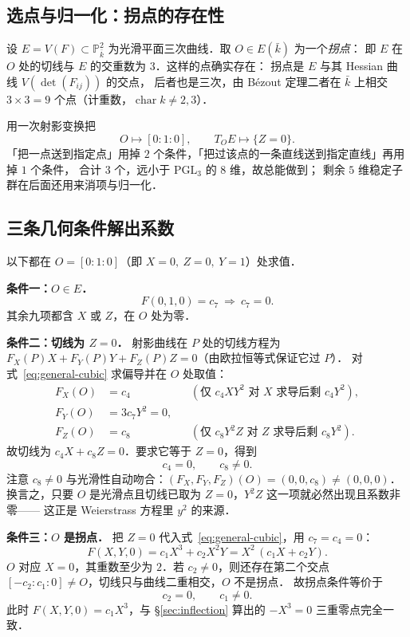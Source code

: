 \documentclass[10pt,a4paper]{article}
\numberwithin{equation}{section}
\begin{document}
\subsection{选点与归一化：拐点的存在性}

设 $E=V(F)\subset\mathbb P^{2}_{\bar k}$ 为光滑平面三次曲线．取 $O\in E(\bar k)$ 为一个\emph{拐点}：
即 $E$ 在 $O$ 处的切线与 $E$ 的交重数为 $3$．这样的点确实存在：
拐点是 $E$ 与其 Hessian 曲线 $V(\det(F_{ij}))$ 的交点，
后者也是三次，由 Bézout 定理二者在 $\bar k$ 上相交 $3\times3=9$ 个点（计重数，$\operatorname{char}k\neq2,3$）．

用一次射影变换把
\[
O\longmapsto[0:1:0],\qquad T_{O}E\longmapsto\{Z=0\}.
\]
「把一点送到指定点」用掉 $2$ 个条件，「把过该点的一条直线送到指定直线」再用掉 $1$ 个条件，
合计 $3$ 个，远小于 $\mathrm{PGL}_{3}$ 的 $8$ 维，故总能做到；
剩余 $5$ 维稳定子群在后面还用来消项与归一化．

\subsection{三条几何条件解出系数}

以下都在 $O=[0:1:0]$（即 $X=0,\ Z=0,\ Y=1$）处求值．

\textbf{条件一：$O\in E$．}
\[
F(0,1,0)=c_{7}\ \Longrightarrow\ \boxed{c_{7}=0}.
\]
其余九项都含 $X$ 或 $Z$，在 $O$ 处为零．

\textbf{条件二：切线为 $Z=0$．}
射影曲线在 $P$ 处的切线方程为
$F_{X}(P)X+F_{Y}(P)Y+F_{Z}(P)Z=0$（由欧拉恒等式保证它过 $P$）．
对式~\eqref{eq:general-cubic} 求偏导并在 $O$ 处取值：
\begin{align}
F_{X}(O)&=c_{4} &&(\text{仅 }c_{4}XY^{2}\text{ 对 }X\text{ 求导后剩 }c_{4}Y^{2}),\\
F_{Y}(O)&=3c_{7}Y^{2}=0,\\
F_{Z}(O)&=c_{8} &&(\text{仅 }c_{8}Y^{2}Z\text{ 对 }Z\text{ 求导后剩 }c_{8}Y^{2}).
\end{align}
故切线为 $c_{4}X+c_{8}Z=0$．要求它等于 $Z=0$，得到
\[
\boxed{c_{4}=0,\qquad c_{8}\neq0}.
\]
注意 $c_{8}\neq0$ 与光滑性自动吻合：$(F_{X},F_{Y},F_{Z})(O)=(0,0,c_{8})\neq(0,0,0)$．
换言之，只要 $O$ 是光滑点且切线已取为 $Z=0$，$Y^{2}Z$ 这一项就必然出现且系数非零——
这正是 Weierstrass 方程里 $y^{2}$ 的来源．

\textbf{条件三：$O$ 是拐点．}
把 $Z=0$ 代入式~\eqref{eq:general-cubic}，用 $c_{7}=c_{4}=0$：
\begin{equation}\label{eq:F-on-infty}
F(X,Y,0)=c_{1}X^{3}+c_{2}X^{2}Y=X^{2}\,(c_{1}X+c_{2}Y).
\end{equation}
$O$ 对应 $X=0$，其重数至少为 $2$．若 $c_{2}\neq0$，则还存在第二个交点
$[-c_{2}:c_{1}:0]\neq O$，切线只与曲线二重相交，$O$ 不是拐点．
故拐点条件等价于
\[
\boxed{c_{2}=0,\qquad c_{1}\neq0}.
\]
此时 $F(X,Y,0)=c_{1}X^{3}$，与 \S\ref{sec:inflection} 算出的 $-X^{3}=0$ 三重零点完全一致．
\end{document}

